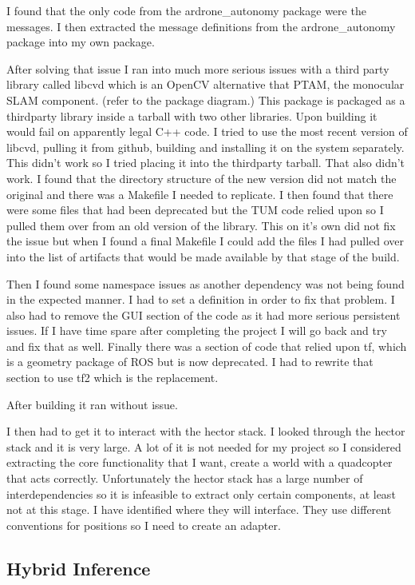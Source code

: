 \documentclass[]{../resources/final_report}
\begin{document}
I found that the only code from the ardrone\_autonomy package were the messages. I then extracted the message definitions from the ardrone\_autonomy package into my own package.

After solving that issue I ran into much more serious issues with a third party library called libcvd which is an OpenCV alternative that PTAM, the monocular SLAM component. (refer to the package diagram.)
This package is packaged as a thirdparty library inside a tarball with two other libraries.
Upon building it would fail on apparently legal C++ code. I tried to use the most recent version of libcvd, pulling it from github, building and installing it on the system separately. This didn't work so I tried placing it into the thirdparty tarball.
That also didn't work. I found that the directory structure of the new version did not match the original and there was a Makefile I needed to replicate. I then found that there were some files that had been deprecated but the TUM code relied upon so I pulled them over from an old version of the library.
This on it's own did not fix the issue but when I found a final Makefile I could add the files I had pulled over into the list of artifacts that would be made available by that stage of the build. 

Then I found some namespace issues as another dependency was not being found in the expected manner. I had to set a definition in order to fix that problem.
I also had to remove the GUI section of the code as it had more serious persistent issues. If I have time spare after completing the project I will go back and try and fix that as well.
Finally there was a section of code that relied upon tf, which is a geometry package of ROS but is now deprecated. I had to rewrite that section to use tf2 which is the replacement.

After building it ran without issue.

I then had to get it to interact with the hector stack. I looked through the hector stack and it is very large. A lot of it is not needed for my project so I considered extracting the core functionality that I want, create a world with a quadcopter that acts correctly.
Unfortunately the hector stack has a large number of interdependencies so it is infeasible to extract only certain components, at least not at this stage.
I have identified where they will interface. They use different conventions for positions so I need to create an adapter.

\subsection{Hybrid Inference}
\end{document}

